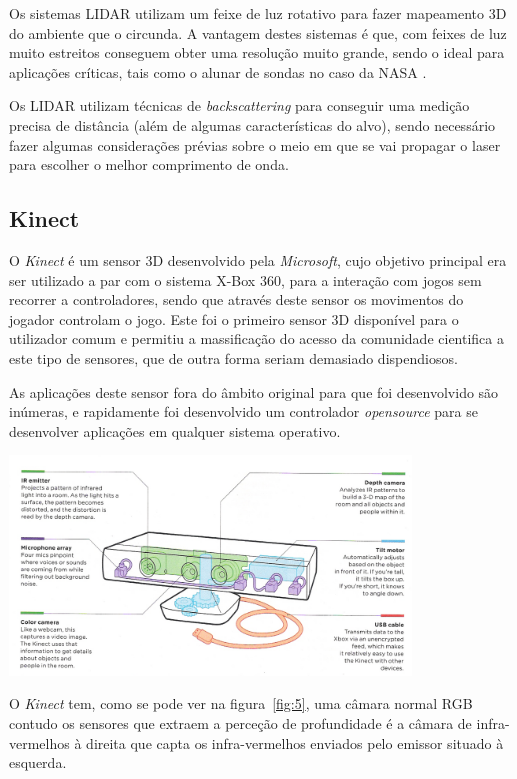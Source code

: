 Os sistemas LIDAR utilizam um feixe de luz rotativo para fazer mapeamento 3D
do ambiente que o circunda. A vantagem destes sistemas é que, com feixes de
luz muito estreitos conseguem obter uma resolução muito grande, sendo o ideal
para aplicações críticas, tais como o alunar de sondas no caso da NASA \cite{Keim2010}.

Os LIDAR utilizam técnicas de \emph{backscattering} para conseguir uma medição
precisa de distância (além de algumas características do alvo), sendo necessário fazer algumas considerações prévias sobre o meio em que se vai propagar o laser para escolher o melhor comprimento de onda.


\subsection{Kinect}\label{kinect}

O \emph{Kinect} é um sensor 3D desenvolvido pela \emph{Microsoft}, cujo objetivo principal era ser utilizado a par com o sistema X-Box 360, para a interação com jogos sem recorrer a controladores, sendo que através deste sensor os movimentos do jogador controlam o jogo. Este foi o primeiro sensor 3D disponível para o utilizador comum e permitiu a massificação do acesso da comunidade cientifica a este tipo de sensores, que de outra forma seriam demasiado dispendiosos.

As aplicações deste sensor fora do âmbito original para que foi desenvolvido são inúmeras, e rapidamente foi desenvolvido um controlador \emph{opensource} para se desenvolver aplicações em qualquer sistema operativo.

\begin{center}
	\includegraphics[width=0.80\textwidth]{./figures/Kinect.png}
	\label{fig:5}
\end{center}

O \emph{Kinect} tem, como se pode ver na figura~\ref{fig:5}, uma câmara normal RGB 
contudo os sensores que extraem a perceção de profundidade é a câmara de infra-vermelhos à direita
que capta os infra-vermelhos enviados pelo emissor situado à esquerda.

